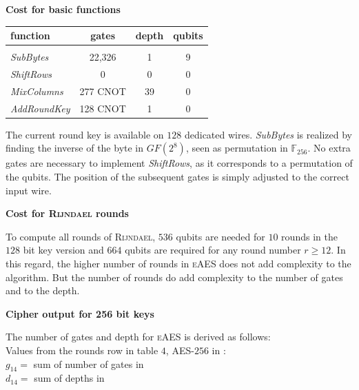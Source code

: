 \documentclass[a4paper,11pt]{article}
\begin{document}
\begin{otherlanguage}{english}
\begin{multicols}{2}
\begin{center}
\textbf{Cost for basic functions} \\
\vspace{0.2cm}
  \begin{tabular}{l|c|c|c}
  function &  gates & depth & qubits \\ 
  \hline
    &  &  & \\ [-8pt]
  \textit{SubBytes} & 22,326  &  1 & 9 \\
  \textit{ShiftRows} & 0 & 0 & 0  \\ 
  \textit{MixColumns} & 277 CNOT & 39 & 0 \\
  \textit{AddRoundKey} & 128 CNOT &  1 & 0 \\ 
  \end{tabular} 
\end{center}

\noindent
The current round key is available on $128$ dedicated wires. \textit{SubBytes} is realized by finding the inverse of the byte in $GF (2^8)$, seen as permutation in $\mathbb{F}_{256}$.  No extra gates are necessary to implement \textit{ShiftRows}, as it corresponds to a permutation of the qubits. The position of the subsequent gates is simply adjusted to the correct input wire. 

\begin{center}
\textbf{Cost for \textsc{Rijndael} rounds} \\
\end{center}

\noindent
To compute all rounds of \textsc{Rijndael}, $536$ qubits are needed for $10$ rounds in the $128$ bit key version and $664$ qubits are required for any round number $r \geq 12$. In this regard, the higher number of rounds in \textsc{eAES} does not add complexity to the algorithm. But the number of rounds do add complexity to the number of gates and to the depth. \\

\begin{center}
\textbf{Cipher output for 256 bit keys} \\
\end{center}

\noindent
The number of gates and depth for \textsc{eAES} is derived as follows: \\

\noindent
Values from the rounds row in table $4$, \textsc{AES}-$256$ in \cite{GRO} : \\ 

\noindent
$g_{14}=$ sum of number of gates in \cite{GRO} \\
$d_{14}=$ sum of depths in \cite{GRO} \\


\end{multicols}
\end{otherlanguage}
\end{document}

